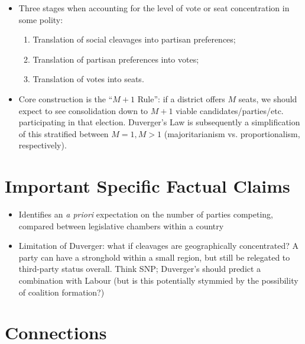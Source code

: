 \documentclass[12pt]{article}
\begin{document}
\begin{itemize}[leftmargin=*, itemsep=4pt]
\begin{itemize}
    \end{itemize}
    Quite a bit of this also rises out of questions of endogeneity over electoral systems -- they are, of course, endogenous in initial construction, but what about their long-term forms? Presumably parties can shape electoral institutions over time in accordance with their own strategic visions
    \item Three stages when accounting for the level of vote or seat concentration in some polity:
    \begin{enumerate}
        \item Translation of social cleavages into partisan preferences;
        \item Translation of partisan preferences into votes;
        \item Translation of votes into seats.
    \end{enumerate}
    \item Core construction is the ``$M + 1$ Rule'': if a district offers $M$ seats, we should expect to see consolidation down to $M+1$ viable candidates/parties/etc. participating in that election. Duverger's Law is subsequently a simplification of this stratified between $M = 1, M > 1$ (majoritarianism vs. proportionalism, respectively).
\end{itemize}


\section{Important Specific Factual Claims}

\begin{itemize}[leftmargin=*, itemsep=4pt]
    \item Identifies an \emph{a priori} expectation on the number of parties competing, compared between legislative chambers within a country
    \item Limitation of Duverger: what if cleavages are geographically concentrated? A party can have a stronghold within a small region, but still be relegated to third-party status overall. Think SNP; Duverger's should predict a combination with Labour (but is this potentially stymmied by the possibility of coalition formation?)
\end{itemize}


\section{Connections}
\end{document}
